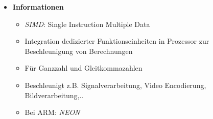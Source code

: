     \begin{itemize}
        \item \textbf{Informationen}
            \begin{itemize}
                \item \textit{SIMD}: Single Instruction Multiple Data
                \item Integration dedizierter Funktionseinheiten in Prozessor zur Beschleunigung von Berechnungen
                \item Für Ganzzahl und Gleitkommazahlen
                \item Beschleunigt z.B. Signalverarbeitung, Video Encodierung, Bildverarbeitung,..
                \item Bei ARM: \textit{NEON}
            \end{itemize}


\end{itemize}
